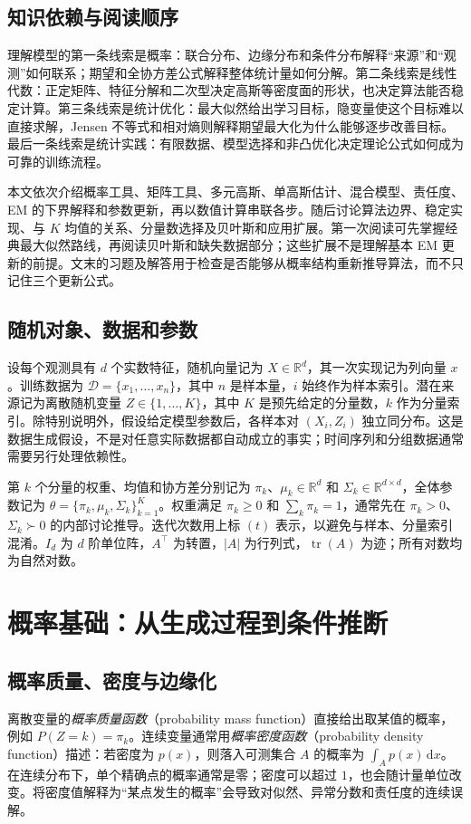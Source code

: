 \documentclass[UTF8,12pt,a4paper,fontset=fandol]{ctexart}
\begin{document}
\subsection{知识依赖与阅读顺序}
理解模型的第一条线索是概率：联合分布、边缘分布和条件分布解释“来源”和“观测”如何联系；期望和全协方差公式解释整体统计量如何分解。第二条线索是线性代数：正定矩阵、特征分解和二次型决定高斯等密度面的形状，也决定算法能否稳定计算。第三条线索是统计优化：最大似然给出学习目标，隐变量使这个目标难以直接求解，Jensen 不等式和相对熵则解释期望最大化为什么能够逐步改善目标。最后一条线索是统计实践：有限数据、模型选择和非凸优化决定理论公式如何成为可靠的训练流程。

本文依次介绍概率工具、矩阵工具、多元高斯、单高斯估计、混合模型、责任度、EM 的下界解释和参数更新，再以数值计算串联各步。随后讨论算法边界、稳定实现、与 $K$ 均值的关系、分量数选择及贝叶斯和应用扩展。第一次阅读可先掌握经典最大似然路线，再阅读贝叶斯和缺失数据部分；这些扩展不是理解基本 EM 更新的前提。文末的习题及解答用于检查是否能够从概率结构重新推导算法，而不只记住三个更新公式。

\subsection{随机对象、数据和参数}
设每个观测具有 $d$ 个实数特征，随机向量记为 $X\in\mathbb R^d$，其一次实现记为列向量 $x$。训练数据为 $\mathcal D=\{x_1,\ldots,x_n\}$，其中 $n$ 是样本量，$i$ 始终作为样本索引。潜在来源记为离散随机变量 $Z\in\{1,\ldots,K\}$，其中 $K$ 是预先给定的分量数，$k$ 作为分量索引。除特别说明外，假设给定模型参数后，各样本对 $(X_i,Z_i)$ 独立同分布。这是数据生成假设，不是对任意实际数据都自动成立的事实；时间序列和分组数据通常需要另行处理依赖性。

第 $k$ 个分量的权重、均值和协方差分别记为 $\pi_k$、$\mu_k\in\mathbb R^d$ 和 $\Sigma_k\in\mathbb R^{d\times d}$，全体参数记为 $\theta=\{\pi_k,\mu_k,\Sigma_k\}_{k=1}^K$。权重满足 $\pi_k\geq0$ 和 $\sum_k\pi_k=1$，通常先在 $\pi_k>0$、$\Sigma_k\succ0$ 的内部讨论推导。迭代次数用上标 $(t)$ 表示，以避免与样本、分量索引混淆。$I_d$ 为 $d$ 阶单位阵，$A^\top$ 为转置，$|A|$ 为行列式，$\operatorname{tr}(A)$ 为迹；所有对数均为自然对数。

\section{概率基础：从生成过程到条件推断}
\label{sec:gmm-probability}

\subsection{概率质量、密度与边缘化}
离散变量的\emph{概率质量函数}（probability mass function）直接给出取某值的概率，例如 $P(Z=k)=\pi_k$。连续变量通常用\emph{概率密度函数}（probability density function）描述：若密度为 $p(x)$，则落入可测集合 $A$ 的概率为 $\int_Ap(x)\,\mathrm dx$。在连续分布下，单个精确点的概率通常是零；密度可以超过 $1$，也会随计量单位改变。将密度值解释为“某点发生的概率”会导致对似然、异常分数和责任度的连续误解。
\end{document}
